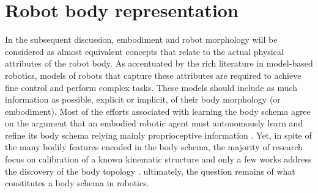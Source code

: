 \section{Robot body representation}
In the subsequent discussion, embodiment and robot morphology will be considered as almost equivalent concepts that relate to the actual physical attributes of the robot body. As accentuated by the rich literature in model-based robotics, models of robots that capture these attributes are required to achieve fine control and perform complex tasks. These models should include as much information as possible, explicit or implicit, of their body morphology (or embodiment). Most of the efforts associated with learning the body schema agree on the argument that an embodied robotic agent must autonomously learn and refine its body schema relying mainly proprioceptive information \cite{Morasso2015Revisitingbodyschema, Hoffmann2010Bodyschemarobotics}. Yet, in spite of the many bodily features encoded in the body schema, the majority of research focus on calibration of a known kinematic structure  and only a few works address the discovery of the body topology .  ultimately, the question remains of what constitutes a body schema in robotics. 


